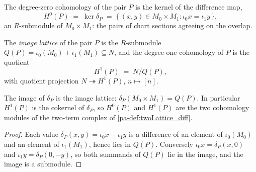 \begin{definition}[\(H^0\) of a pair]
  \label{pa-def:twoLattice_H0}
  \leanok

  The degree-zero cohomology of the pair \(P\) is the kernel of the difference map,
  \[
    H^0(P) \;=\; \ker \delta_P
    \;=\; \{\, (x, y) \in M_0 \times M_1 : \iota_0 x = \iota_1 y \,\},
  \]
  an \(R\)-submodule of \(M_0 \times M_1\): the pairs of chart sections agreeing on the
  overlap.
\end{definition}

\begin{definition}[\(H^1\) of a pair]
  \label{pa-def:twoLattice_H1}
  \leanok

  The \emph{image lattice} of the pair \(P\) is the \(R\)-submodule
  \(Q(P) = \iota_0(M_0) + \iota_1(M_1) \subseteq N\), and the degree-one cohomology of
  \(P\) is the quotient
  \[
    H^1(P) \;=\; N \big/ Q(P),
  \]
  with quotient projection \(N \twoheadrightarrow H^1(P)\), \(n \mapsto [n]\).
\end{definition}

\begin{lemma}
  \label{pa-lem:twoLattice_range_diff}
  \leanok

  The image of \(\delta_P\) is the image lattice: \(\delta_P(M_0 \times M_1) = Q(P)\).
  In particular \(H^1(P)\) is the cokernel of \(\delta_P\), so \(H^0(P)\) and \(H^1(P)\)
  are the two cohomology modules of the two-term complex of \ref{pa-def:twoLattice_diff}.
\end{lemma}
\begin{proof}
  \leanok
  Each value \(\delta_P(x,y) = \iota_0 x - \iota_1 y\) is a difference of an element of
  \(\iota_0(M_0)\) and an element of \(\iota_1(M_1)\), hence lies in \(Q(P)\).
  Conversely \(\iota_0 x = \delta_P(x, 0)\) and \(\iota_1 y = \delta_P(0, -y)\), so both
  summands of \(Q(P)\) lie in the image, and the image is a submodule.
\end{proof}

